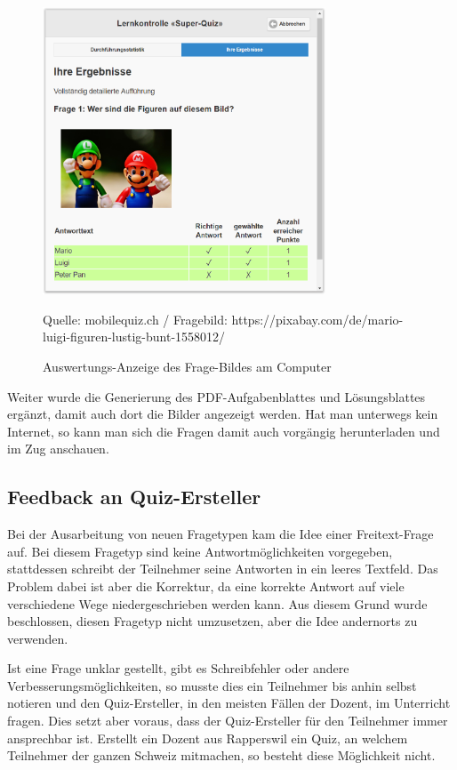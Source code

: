 \begin{figure}[H]
	\centering
	\includegraphics[width=0.75\textwidth]{Images/Quiz-Auswertung_Anzeige.PNG}
	\caption{Auswertungs-Anzeige des Frage-Bildes am Computer}
	Quelle: mobilequiz.ch / Fragebild: https://pixabay.com/de/mario-luigi-figuren-lustig-bunt-1558012/
\end{figure}

Weiter wurde die Generierung des PDF-Aufgabenblattes und Lösungsblattes ergänzt, damit auch dort die Bilder angezeigt werden. Hat man unterwegs kein Internet, so kann man sich die Fragen damit auch vorgängig herunterladen und im Zug anschauen.








\newpage
\subsection{Feedback an Quiz-Ersteller}
Bei der Ausarbeitung von neuen Fragetypen kam die Idee einer Freitext-Frage auf. Bei diesem Fragetyp sind keine Antwortmöglichkeiten vorgegeben, stattdessen schreibt der Teilnehmer seine Antworten in ein leeres Textfeld. Das Problem dabei ist aber die Korrektur, da eine korrekte Antwort auf viele verschiedene Wege niedergeschrieben werden kann. Aus diesem Grund wurde beschlossen, diesen Fragetyp nicht umzusetzen, aber die Idee andernorts zu verwenden.

Ist eine Frage unklar gestellt, gibt es Schreibfehler oder andere Verbesserungsmöglichkeiten, so musste dies ein Teilnehmer bis anhin selbst notieren und den Quiz-Ersteller, in den meisten Fällen der Dozent, im Unterricht fragen. Dies setzt aber voraus, dass der Quiz-Ersteller für den Teilnehmer immer ansprechbar ist. Erstellt ein Dozent aus Rapperswil ein Quiz, an welchem Teilnehmer der ganzen Schweiz mitmachen, so besteht diese Möglichkeit nicht.

